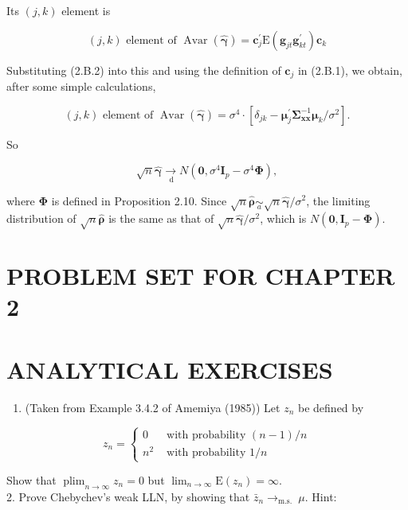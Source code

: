 \documentclass[10pt]{article}
\begin{document}
Its $(j, k)$ element is

$$
(j, k) \text { element of } \operatorname{Avar}(\hat{\boldsymbol{\gamma}})=\mathbf{c}_{j}^{\prime} \mathrm{E}\left(\mathbf{g}_{j t} \mathbf{g}_{k t}^{\prime}\right) \mathbf{c}_{k}
$$

Substituting (2.B.2) into this and using the definition of $\mathbf{c}_{j}$ in (2.B.1), we obtain, after some simple calculations,

$$
(j, k) \text { element of } \operatorname{Avar}(\hat{\boldsymbol{\gamma}})=\sigma^{4} \cdot\left[\delta_{j k}-\boldsymbol{\mu}_{j}^{\prime} \boldsymbol{\Sigma}_{\mathbf{x x}}^{-1} \boldsymbol{\mu}_{k} / \sigma^{2}\right] .
$$

So

$$
\sqrt{n} \hat{\boldsymbol{\gamma}} \underset{\mathrm{~d}}{\rightarrow} N\left(\mathbf{0}, \sigma^{4} \mathbf{I}_{p}-\sigma^{4} \mathbf{\Phi}\right),
$$

where $\boldsymbol{\Phi}$ is defined in Proposition 2.10. Since $\sqrt{n} \hat{\boldsymbol{\rho}} \underset{a}{\sim} \sqrt{n} \hat{\boldsymbol{\gamma}} / \sigma^{2}$, the limiting distribution of $\sqrt{n} \hat{\boldsymbol{\rho}}$ is the same as that of $\sqrt{n} \hat{\boldsymbol{\gamma}} / \sigma^{2}$, which is $N\left(\mathbf{0}, \mathbf{I}_{p}-\boldsymbol{\Phi}\right)$.

\section*{PROBLEM SET FOR CHAPTER 2}
\section*{ANALYTICAL EXERCISES}
\begin{enumerate}
  \item (Taken from Example 3.4.2 of Amemiya (1985)) Let $z_{n}$ be defined by
\end{enumerate}

$$
z_{n}= \begin{cases}0 & \text { with probability }(n-1) / n \\ n^{2} & \text { with probability } 1 / n\end{cases}
$$

Show that $\operatorname{plim}_{n \rightarrow \infty} z_{n}=0$ but $\lim _{n \rightarrow \infty} \mathrm{E}\left(z_{n}\right)=\infty$.\\
2. Prove Chebychev's weak LLN, by showing that $\bar{z}_{n} \rightarrow_{\text {m.s. }} \mu$. Hint:
\end{document}
